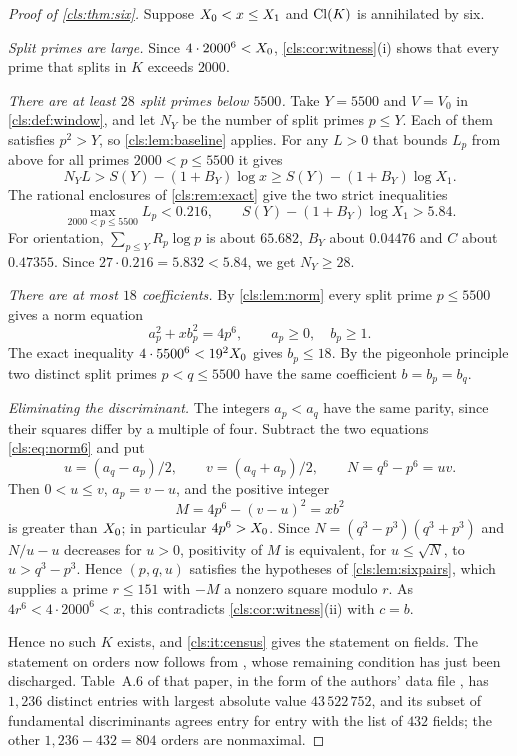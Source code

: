 \begin{proof}[Proof of \cref{cls:thm:six}]
Suppose $X_0<x\le X_1$ and $\operatorname{Cl}(K)$ is annihilated by six.

\emph{Split primes are large.} Since $4\cdot2000^6<X_0$, \cref{cls:cor:witness}(i)
shows that every prime that splits in $K$ exceeds $2000$.

\emph{There are at least $28$ split primes below $5500$.} Take $Y=5500$ and $V=V_0$ in
\cref{cls:def:window}, and let $N_Y$ be the number of split primes $p\le Y$. Each of them
satisfies $p^2>Y$, so \cref{cls:lem:baseline} applies. For any $L>0$ that bounds $L_p$
from above for all primes $2000<p\le5500$ it gives
\[
 N_YL>S(Y)-(1+B_Y)\log x\ge S(Y)-(1+B_Y)\log X_1 .
\]
The rational enclosures of \cref{cls:rem:exact} give the two strict inequalities
\begin{equation}\label{cls:eq:sixmargins}
 \max_{2000<p\le5500}L_p<0.216,\qquad S(Y)-(1+B_Y)\log X_1>5.84 .
\end{equation}
For orientation, $\sum_{p\le Y}R_p\log p$ is about $65.682$, $B_Y$ about $0.04476$ and
$C$ about $0.47355$. Since $27\cdot0.216=5.832<5.84$, we get $N_Y\ge28$.

\emph{There are at most $18$ coefficients.} By \cref{cls:lem:norm} every split prime
$p\le5500$ gives a norm equation
\begin{equation}\label{cls:eq:norm6}
   a_p^2+xb_p^2=4p^6,\qquad a_p\ge0,\quad b_p\ge1 .
\end{equation}
The exact inequality $4\cdot5500^6<19^2X_0$ gives $b_p\le18$. By the pigeonhole
principle two distinct split primes $p<q\le5500$ have the same coefficient $b=b_p=b_q$.

\emph{Eliminating the discriminant.} The integers $a_p<a_q$ have the same parity, since
their squares differ by a multiple of four. Subtract the two equations
\eqref{cls:eq:norm6} and put
\[
   u=(a_q-a_p)/2,\qquad v=(a_q+a_p)/2,\qquad N=q^6-p^6=uv .
\]
Then $0<u\le v$, $a_p=v-u$, and the positive integer
\[
   M=4p^6-(v-u)^2=xb^2
\]
is greater than $X_0$; in particular $4p^6>X_0$. Since $N=(q^3-p^3)(q^3+p^3)$ and
$N/u-u$ decreases for $u>0$, positivity of $M$ is equivalent, for $u\le\sqrt N$, to
$u>q^3-p^3$. Hence $(p,q,u)$ satisfies the hypotheses of \cref{cls:lem:sixpairs}, which
supplies a prime $r\le151$ with $-M$ a nonzero square modulo $r$. As
$4r^6<4\cdot2000^6<x$, this contradicts \cref{cls:cor:witness}(ii) with $c=b$.

Hence no such $K$ exists, and \ref{cls:it:census} gives the statement on fields. The
statement on orders now follows from \cite[Theorem~1.3(5)]{Aiken2026Boundary}, whose
remaining condition has just been discharged. Table~A.6 of that paper, in the form of the
authors' data file \cite{Ross2026Data}, has $1{,}236$ distinct entries with largest
absolute value $43\,522\,752$, and its subset of fundamental discriminants agrees entry
for entry with the list of $432$ fields; the other $1{,}236-432=804$ orders are nonmaximal.
\end{proof}

